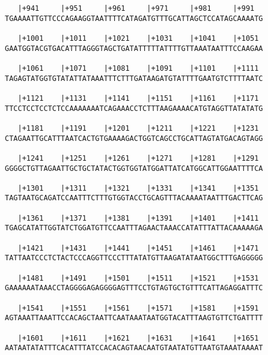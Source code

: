 \documentclass{article}
\begin{document}
\begin{Verbatim}
   |+941     |+951     |+961     |+971     |+981     |+991  
TGAAAATTGTTCCCAGAAGGTAATTTTCATAGATGTTTGCATTAGCTCCATAGCAAAATG
                                                            
   |+1001    |+1011    |+1021    |+1031    |+1041    |+1051 
GAATGGTACGTGACATTTAGGGTAGCTGATATTTTTATTTTGTTAAATAATTTCCAAGAA
                                                            
   |+1061    |+1071    |+1081    |+1091    |+1101    |+1111 
TAGAGTATGGTGTATATTATAAATTTCTTTGATAAGATGTATTTTGAATGTCTTTTAATC
                                                            
   |+1121    |+1131    |+1141    |+1151    |+1161    |+1171 
TTCCTCCTCCTCTCCAAAAAAATCAGAAACCTCTTTAAGAAAACATGTAGGTTATATATG
                                                            
   |+1181    |+1191    |+1201    |+1211    |+1221    |+1231 
CTAGAATTGCATTTAATCACTGTGAAAAGACTGGTCAGCCTGCATTAGTATGACAGTAGG
                                                            
   |+1241    |+1251    |+1261    |+1271    |+1281    |+1291 
GGGGCTGTTAGAATTGCTGCTATACTGGTGGTATGGATTATCATGGCATTGGAATTTTCA
                                                            
   |+1301    |+1311    |+1321    |+1331    |+1341    |+1351 
TAGTAATGCAGATCCAATTTCTTTGTGGTACCTGCAGTTTACAAAATAATTTGACTTCAG
                                                            
   |+1361    |+1371    |+1381    |+1391    |+1401    |+1411 
TGAGCATATTGGTATCTGGATGTTCCAATTTAGAACTAAACCATATTTATTACAAAAAGA
                                                            
   |+1421    |+1431    |+1441    |+1451    |+1461    |+1471 
TATTAATCCCTCTACTCCCAGGTTCCCTTTATATGTTAAGATATAATGGCTTTGAGGGGG
                                                            
   |+1481    |+1491    |+1501    |+1511    |+1521    |+1531 
GAAAAAATAAACCTAGGGGAGAGGGGAGTTTCCTGTAGTGCTGTTTCATTAGAGGATTTC
                                                            
   |+1541    |+1551    |+1561    |+1571    |+1581    |+1591 
AGTAAATTAAATTCCACAGCTAATTCAATAAATAATGGTACATTTAAGTGTTCTGATTTT
                                                            
   |+1601    |+1611    |+1621    |+1631    |+1641    |+1651 
AATAATATATTTCACATTTATCCACACAGTAACAATGTAATATGTTAATGTAAATAAAAT
                                                            

\end{Verbatim}
\end{document}
